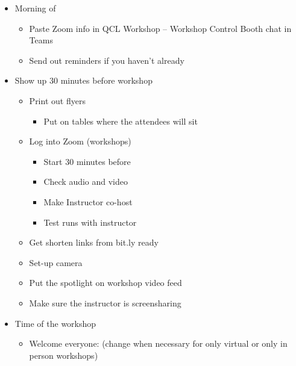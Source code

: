 \documentclass[
]{book}
\providecommand{\tightlist}{%
  \setlength{\itemsep}{0pt}\setlength{\parskip}{0pt}}
\begin{document}
\begin{itemize}
\tightlist
\item
  Morning of

  \begin{itemize}
  \tightlist
  \item
    Paste Zoom info in QCL Workshop -- Workshop Control Booth chat in Teams
  \item
    Send out reminders if you haven't already
  \end{itemize}
\item
  Show up 30 minutes before workshop

  \begin{itemize}
  \tightlist
  \item
    Print out flyers

    \begin{itemize}
    \tightlist
    \item
      Put on tables where the attendees will sit
    \end{itemize}
  \item
    Log into Zoom (workshops)

    \begin{itemize}
    \tightlist
    \item
      Start 30 minutes before
    \item
      Check audio and video
    \item
      Make Instructor co-host
    \item
      Test runs with instructor
    \end{itemize}
  \item
    Get shorten links from bit.ly ready
  \item
    Set-up camera
  \item
    Put the spotlight on workshop video feed
  \item
    Make sure the instructor is screensharing
  \end{itemize}
\item
  Time of the workshop

  \begin{itemize}
  \tightlist
  \item
    Welcome everyone: (change when necessary for only virtual or only in person workshops)


\end{itemize}
\end{itemize}
\end{document}
